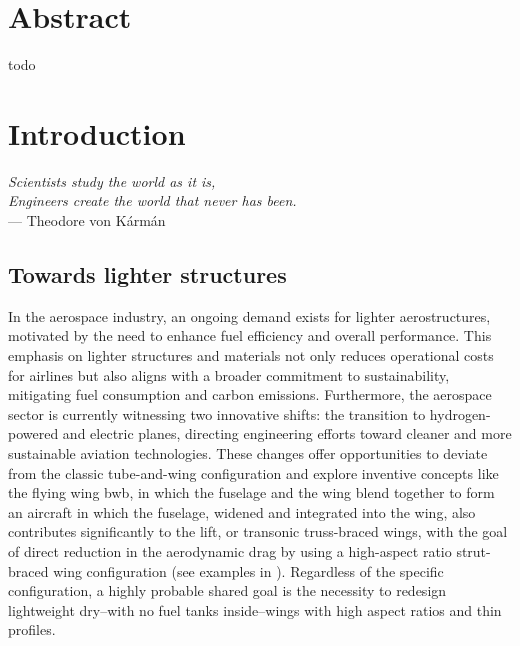 \chapter*{Abstract}
{}%
%
todo

\newpage
\chapter*{Introduction}
{}
%


\textit{Scientists study the world as it is,}\\
\textit{Engineers create the world that never has been.} \vspace{5pt} \\
--- Theodore von K\'arm\'an \\

\section*{Towards lighter structures}

In the aerospace industry, an ongoing demand exists for lighter aerostructures, motivated by the need to enhance fuel efficiency and overall performance. This emphasis on lighter structures and materials not only reduces operational costs for airlines but also aligns with a broader commitment to sustainability, mitigating fuel consumption and carbon emissions. Furthermore, the aerospace sector is currently witnessing two innovative shifts: the transition to hydrogen-powered and electric planes, directing engineering efforts toward cleaner and more sustainable aviation technologies. These changes offer opportunities to deviate from the classic tube-and-wing configuration and explore inventive concepts like the flying wing \gls{bwb}, in which the fuselage and the wing blend together to form an aircraft in which the fuselage, widened and integrated into the wing, also contributes significantly to the lift, or transonic truss-braced wings, with the goal of direct reduction in the aerodynamic drag by using a high-aspect ratio strut-braced wing configuration (see examples in ). Regardless of the specific configuration, a highly probable shared goal is the necessity to redesign lightweight dry--\ie with no fuel tanks inside--wings with high aspect ratios and thin profiles.

